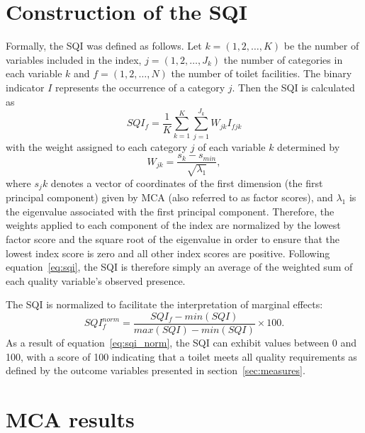 \documentclass[natbib]{svjour3}                     %
\begin{document}
\section{Construction of the SQI}
\label{sec:sqi}
Formally, the SQI was defined as follows. Let $k=(1,2,\dots,K)$ be the number of variables included in the index, $j=(1,2,\dots,J_k)$ the number of categories in each variable $k$ and $f=(1,2,\dots,N)$ the number of toilet facilities. The binary indicator $I$ represents the occurrence of a category $j$. Then the SQI is calculated as
\begin{equation}
\label{eq:sqi}
    SQI_f = \frac{1}{K} \sum_{k=1}^{K} \sum_{j=1}^{J_k} W_{jk} I_{fjk}
\end{equation}
with the weight assigned to each category $j$ of each variable $k$ determined by
\begin{equation}
    W_{jk} = \frac{s_k - s_{min}}{\sqrt{\lambda_1}},
\end{equation}
where $s_jk$ denotes a vector of coordinates of the first dimension (the first principal component) given by MCA (also referred to as factor scores), and $\lambda_1$ is the eigenvalue associated with the first principal component. Therefore, the weights applied to each component of the index are normalized by the lowest factor score and the square root of the eigenvalue in order to ensure that the lowest index score is zero and all other index scores are positive. Following equation~\ref{eq:sqi}, the SQI is therefore simply an average of the weighted sum of each quality variable's observed presence. 

The SQI is normalized to facilitate the interpretation of marginal effects:
\begin{equation}
\label{eq:sqi_norm}
    SQI_f^{norm} = \frac{SQI_f - min(SQI)}{max(SQI)-min(SQI)} \times 100.
\end{equation}
As a result of equation~\ref{eq:sqi_norm}, the SQI can exhibit values between 0 and 100, with a score of 100 indicating that a toilet meets all quality requirements as defined by the outcome variables presented in section~\ref{sec:measures}.

\section{MCA results}
\end{document}
